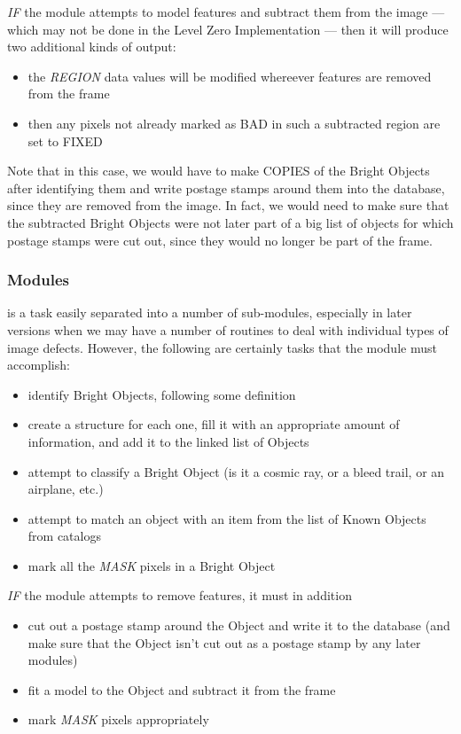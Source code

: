   {\it IF} the module attempts to model features and subtract them from
the image --- which may not be done in the Level Zero Implementation ---
then it will produce two additional kinds of output:

\begin{itemize}
  \item the {\it REGION} data values will be modified whereever
        features are removed from the frame
  \item then any pixels not already marked as BAD in such a subtracted 
        region are set to FIXED
\end{itemize}

  Note that in this case, we would have to make COPIES of the Bright
Objects after identifying them and write postage stamps around them
into the database, since they are removed from the image.
In fact, we would need to make sure that the subtracted Bright Objects
were not later part of a big list of objects for which postage
stamps were cut out, since they would no longer be part of the frame.

\subsubsection {Modules}

  \bom is a task easily separated into a number of sub-modules, especially
in later versions when we may have a number of routines to deal with
individual types of image defects.  However, the following are
certainly tasks that the module must accomplish:

\begin{itemize}
  \item identify Bright Objects, following some definition
  \item create a structure for each one, fill it with an appropriate amount
        of information, and add it to the linked list of Objects
  \item attempt to classify a Bright Object (is it a cosmic ray, or a
        bleed trail, or an airplane, etc.)
  \item attempt to match an object with an item from the list of Known
        Objects from catalogs
  \item mark all the {\it MASK} pixels in a Bright Object
\end{itemize}

  {\it IF} the module attempts to remove features, it must in addition

\begin{itemize}
  \item cut out a postage stamp around the Object and write it to
        the database (and make sure that the Object isn't cut out
        as a postage stamp by any later modules)
  \item fit a model to the Object and subtract it from the frame
  \item mark {\it MASK} pixels appropriately
\end{itemize}

